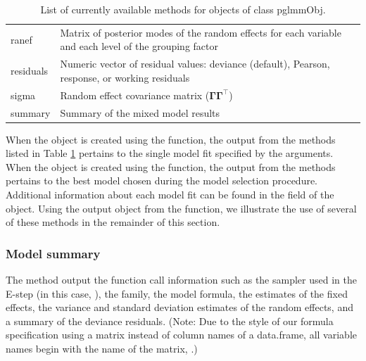 \begin{table}[h!]
\begin{tabular}{lp{5in}}
  ranef & Matrix of posterior modes of the random effects for each variable and each level of the grouping factor \\
  residuals & Numeric vector of residual values: deviance (default), Pearson, response, or working residuals \\
  sigma & Random effect covariance matrix ($\boldsymbol{\Gamma\Gamma}^\top$) \\
  summary & Summary of the mixed model results \\
  \bottomrule
  \end{tabular}
  \caption{List of currently available methods for objects of class pglmmObj.}
  \label{tab:methods}
\end{table}

When the  object is created using the  function, the output from the methods listed in Table \ref{tab:methods} pertains to the single model fit specified by the  arguments. When the  object is created using the  function, the output from the methods pertains to the best model chosen during the model
selection procedure. Additional information about each model fit can be found in the  field of the  object. Using the  output object
 from the  function, we illustrate the use of several of these methods in the remainder of this section. 


\subsubsection{Model summary}
\label{sec:model-summary}

The  method output the function call information such as the sampler used in the E-step (in this case, ), the family, the model formula, the estimates of the fixed effects, the variance and standard deviation estimates of the random effects, and a summary of the deviance residuals. (Note: Due to the style of our formula specification using a matrix instead of column names of a data.frame, all variable names begin with the name of the matrix, .)

